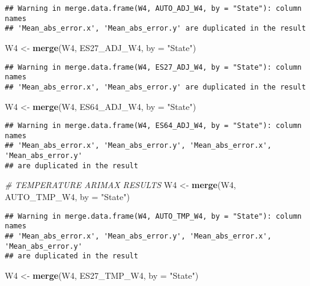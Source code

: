 \documentclass[
]{article}
\newenvironment{Shaded}{\begin{snugshade}}{\end{snugshade}}
\newcommand{\AttributeTok}[1]{\textcolor[rgb]{0.13,0.29,0.53}{#1}}
\newcommand{\CommentTok}[1]{\textcolor[rgb]{0.56,0.35,0.01}{\textit{#1}}}
\newcommand{\FunctionTok}[1]{\textcolor[rgb]{0.13,0.29,0.53}{\textbf{#1}}}
\newcommand{\NormalTok}[1]{#1}
\newcommand{\OtherTok}[1]{\textcolor[rgb]{0.56,0.35,0.01}{#1}}
\newcommand{\StringTok}[1]{\textcolor[rgb]{0.31,0.60,0.02}{#1}}
\begin{document}
\begin{verbatim}
## Warning in merge.data.frame(W4, AUTO_ADJ_W4, by = "State"): column names
## 'Mean_abs_error.x', 'Mean_abs_error.y' are duplicated in the result
\end{verbatim}

\begin{Shaded}
\begin{Highlighting}[]
\NormalTok{W4 }\OtherTok{\textless{}{-}} \FunctionTok{merge}\NormalTok{(W4, ES27\_ADJ\_W4, }\AttributeTok{by =} \StringTok{"State"}\NormalTok{)}
\end{Highlighting}
\end{Shaded}

\begin{verbatim}
## Warning in merge.data.frame(W4, ES27_ADJ_W4, by = "State"): column names
## 'Mean_abs_error.x', 'Mean_abs_error.y' are duplicated in the result
\end{verbatim}

\begin{Shaded}
\begin{Highlighting}[]
\NormalTok{W4 }\OtherTok{\textless{}{-}} \FunctionTok{merge}\NormalTok{(W4, ES64\_ADJ\_W4, }\AttributeTok{by =} \StringTok{"State"}\NormalTok{)}
\end{Highlighting}
\end{Shaded}

\begin{verbatim}
## Warning in merge.data.frame(W4, ES64_ADJ_W4, by = "State"): column names
## 'Mean_abs_error.x', 'Mean_abs_error.y', 'Mean_abs_error.x', 'Mean_abs_error.y'
## are duplicated in the result
\end{verbatim}

\begin{Shaded}
\begin{Highlighting}[]
\CommentTok{\# TEMPERATURE ARIMAX RESULTS}
\NormalTok{W4 }\OtherTok{\textless{}{-}} \FunctionTok{merge}\NormalTok{(W4, AUTO\_TMP\_W4, }\AttributeTok{by =} \StringTok{"State"}\NormalTok{)}
\end{Highlighting}
\end{Shaded}

\begin{verbatim}
## Warning in merge.data.frame(W4, AUTO_TMP_W4, by = "State"): column names
## 'Mean_abs_error.x', 'Mean_abs_error.y', 'Mean_abs_error.x', 'Mean_abs_error.y'
## are duplicated in the result
\end{verbatim}

\begin{Shaded}
\begin{Highlighting}[]
\NormalTok{W4 }\OtherTok{\textless{}{-}} \FunctionTok{merge}\NormalTok{(W4, ES27\_TMP\_W4, }\AttributeTok{by =} \StringTok{"State"}\NormalTok{)}
\end{Highlighting}
\end{Shaded}
\end{document}
